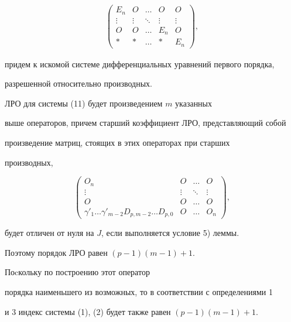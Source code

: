 \begin{pf}
\begin{multline*}
\begin{pmatrix}
E_n & O & \dotsc & O & O\\


\vdots & \vdots & \ddots & \vdots & \vdots\\


O & O & \dotsc & E_n & O\\


\ast & * & \dotsc & * & E_n


\end{pmatrix}


,


\end{multline*}


придем к искомой системе дифференциальных уравнений первого порядка,


разрешенной относительно производных.





ЛРО для системы (11) будет произведением $m$ указанных


выше операторов, причем старший коэффициент ЛРО, представляющий собой


произведение матриц, стоящих в этих операторах при старших 


производных,


$$


\begin{pmatrix}


O_n & O & \dotsc & O\\


\vdots & \vdots & \ddots & \vdots\\


O & O & \dotsc & O\\


\gamma'_1 \dotsc \gamma'_{m-2}D_{p,m-2} \dotsc D_{p,0} &


O & \dotsc & O_n


\end{pmatrix} 


,


$$


будет отличен от нуля на $J$, если выполняется условие 5) леммы. 


Поэтому порядок ЛРО равен $(p-1)(m-1)+1$.


Поcкольку по построению этот оператор


порядка наименьшего из возможных, то в соответствии с определениями 1


и 3 индекс системы (1), (2) будет также равен $(p-1)(m-1)+1$.


\end{pf}






